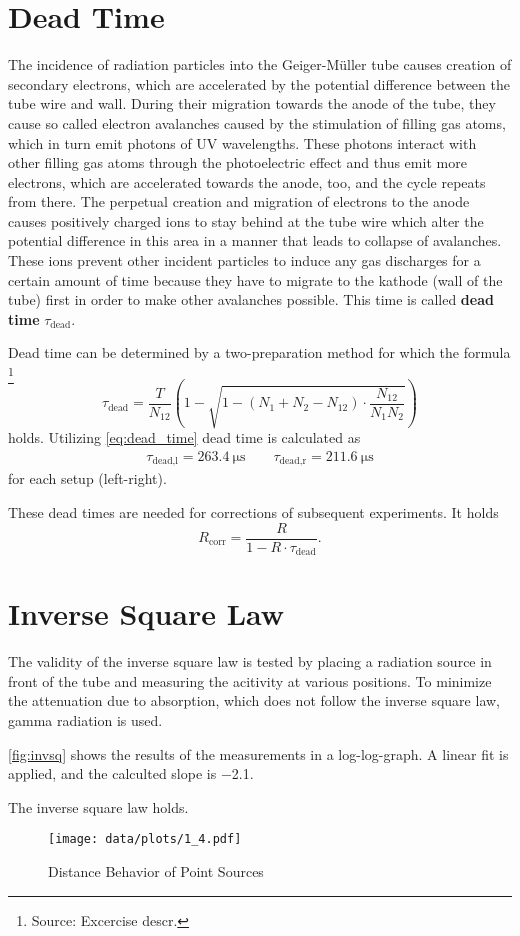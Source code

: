 \section{Dead Time}
The incidence of radiation particles into the Geiger-Müller tube causes creation of secondary electrons, which are accelerated by the potential difference between the tube wire and wall.
During their migration towards the anode of the tube, they cause so called electron avalanches caused by the stimulation of filling gas atoms, which in turn emit photons of UV wavelengths.
These photons interact with other filling gas atoms through the photoelectric effect and thus emit more electrons, which are accelerated towards the anode, too, and the cycle repeats from there.
The perpetual creation and migration of electrons to the anode causes positively charged ions to stay behind at the tube wire which alter the potential difference in this area in a manner that leads to collapse of avalanches.
These ions prevent other incident particles to induce any gas discharges for a certain amount of time because they have to migrate to the kathode (wall of the tube) first in order to make other avalanches possible.
This time is called \textbf{dead time} $\tau_\text{dead}$.

Dead time can be determined by a two-preparation method for which the formula \footnote{Source: Excercise descr.}
\begin{equation}\label{eq:dead_time}
	\tau_\text{dead} = \frac{T}{N_{12}}\left(1-\sqrt{1-\left(N_1+N_2-N_{12}\right)\cdot\frac{N_{12}}{N_1N_2}}\right)
\end{equation}
holds.
Utilizing \autoref{eq:dead_time} dead time is calculated as
\begin{gather*}
 	\tau_\text{dead,l}=\SI{263.4}{\micro\second}\qquad \tau_\text{dead,r}=\SI{211.6}{\micro\second}
\end{gather*}
for each setup (left-right).

These dead times are needed for corrections of subsequent experiments.
It holds
\begin{equation}\label{eq:dead_time_corr}
	R_\text{corr}=\frac{R}{1-R\cdot\tau_\text{dead}}.
\end{equation}

\section{Inverse Square Law}
The validity of the inverse square law is tested by placing a radiation source in front of the tube and measuring the acitivity at various positions.
To minimize the attenuation due to absorption, which does not follow the inverse square law, gamma radiation is used.

\autoref{fig:invsq} shows the results of the measurements in a log-log-graph.
A linear fit is applied, and the calculted slope is \num{-2.1}.

The inverse square law holds.

\begin{figure}[tb]
	\centering
	\texttt{[image: data/plots/1\_4.pdf]}
	\caption{Distance Behavior of Point Sources}
	\label{fig:invsq}
\end{figure}
